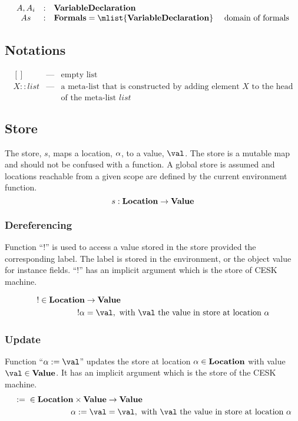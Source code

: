 \documentclass{article}
\begin{document}
\[
  \begin{array}{ccll}
	\formal, \formali{i} & : & \dvardecl\\
	\formals & : & \dformals = \mlist{\dvardecl} &\textrm{ domain of formals}\\

  \end{array}
\]

\subsection{Notations}
\label{subsec:notations}

\[
  \begin{array}{lcl}
    [] &\text{---}& \text{empty list}\\
    X :: list &\text{---}& \text{a meta-list that is constructed by adding element $X$ to the head}\\
    && \text{of the meta-list $list$}
  \end{array}
\]

\subsection{Store}
\label{subsec:store-definition}
The store, $s$, maps a location, $\alpha$, to a value, $\val$.
The store is a mutable map and should not be confused with a function.
A global store is assumed and locations reachable from a given scope are defined by the current environment function.
\[s : \mathbf{Location} \rightarrow \mathbf{Value} \]
\subsubsection{Dereferencing}
\label{subsubsection:dereferecing}
\newcommand{\deref}[1]{!#1}
Function ``$\deref{}$'' is used to access a value stored in the store provided the corresponding label.
The label is stored in the environment, or the object value for instance fields.
``$\deref{}$'' has an implicit argument which is the store of CESK machine.

\begin{align*}
  \deref{} \in \dlocation &\rightarrow \dval \\
  \deref{\loc} &=  \val, \textrm{ with $\val$ the value in store at location } \loc
\end{align*}
\subsubsection{Update}
\label{subsubsec:store-update}
\newcommand{\update}[2]{{#1} := {#2}}
Function ``$\update{\loc}{\val}$'' updates the store at location $\alpha \in \mathbf{Location}$ with value $\val \in \dval$.
It has an implicit argument which is the store of the CESK machine.
\begin{align*}
  \update{}{} \in \dlocation \times \dval &\rightarrow  \dval\\
  \update{\loc}{\val} &= \val, \textrm{ with $\val$ the value in store at location $\loc$}
\end{align*}
\end{document}
